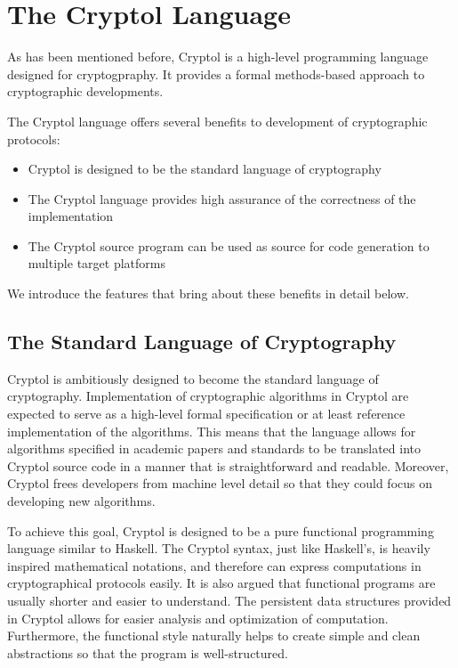 \documentclass[a4paper, notitlepage]{report}
\renewcommand{\paragraph}[1]{\vspace*{1em}\noindent\textbf{#1}\hspace*{1em}}
\begin{document}
\section{The Cryptol Language}
\label{sec:cryptol}

As has been mentioned before, Cryptol is a high-level programming language
designed for cryptogpraphy. It provides a formal methods-based approach
to cryptographic developments.

The Cryptol language offers several benefits to development of cryptographic
protocols:
\begin{itemize}
\item Cryptol is designed to be the standard language of cryptography
\item The Cryptol language provides high assurance of the correctness
of the implementation
\item The Cryptol source program can be used as source for code generation
to multiple target platforms
\end{itemize} 

We introduce the features that bring about these benefits in detail below.

\subsection{The Standard Language of Cryptography}

Cryptol is ambitiously designed to become the standard language of cryptography.
Implementation of cryptographic algorithms in Cryptol are expected to serve as 
a high-level formal specification or at least reference implementation 
of the algorithms.
This means that the language allows for algorithms specified in academic
papers and standards to be translated into Cryptol source code in a manner that
is straightforward and readable.
Moreover, Cryptol frees developers from machine level detail
so that they could focus on developing new algorithms.

To achieve this goal, Cryptol is designed to be a pure functional programming
language similar to Haskell. The Cryptol syntax, just like Haskell's, is
heavily inspired mathematical notations, and therefore can express computations
in cryptographical protocols easily.
It is also argued that functional programs
are usually shorter and easier to understand.
The persistent data structures provided in Cryptol
allows for easier analysis and optimization of computation. Furthermore,
the functional style naturally helps to create simple and clean abstractions so
that the program is well-structured. 
\end{document}
